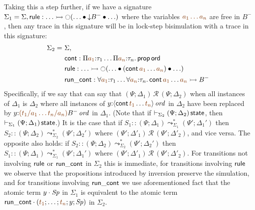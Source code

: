 Taking this a step further, if we have a signature
$\Sigma_1 = \Sigma, {\sf rule} : \ldots \rightarrowtail {\ocircle}(\ldots \mathbin{\bullet} {\downarrow}B^- \mathbin{\bullet} \ldots)
$
where the variables $\lf{a_1\ldots a_n}$ are free in $B^-$, 
then any trace in this signature will be in lock-step bisimulation
with a trace in this signature: 
\begin{align*}
\Sigma_2 = ~ & \Sigma,
\\    ~~ & {\sf cont} :  \Pi\lf{a_1}{:}\tau_1\ldots \Pi\lf{a_n}{:}\tau_n.\,{\sf prop}\,{\sf ord}
\\    ~~ & {\sf rule} : \ldots \lefti {\ocircle}(\ldots \fuse ({\sf cont}\,\lf{a_1}\ldots\lf{a_n}) \fuse \ldots)
\\    ~~ & {\sf run\_cont} : \forall\lf{a_1}{:}\tau_1\ldots \forall\lf{a_n}{:}\tau_n.\,{\sf cont}\,\lf{a_1}\ldots\lf{a_n} \lefti B^-
\end{align*}
Specifically, if we say that 
can say that $(\Psi; \Delta_1) \,\mathcal R\, (\Psi; \Delta_2)$ when 
all instances of $\Delta_1$ is $\Delta_2$ where all instances of 
$y{:}\istrue{\susp{{\sf cont}\,\lf{t_1}\ldots\lf{t_n}}}$ in $\Delta_2$ have been
replaced by $y{:}\istrue{\lf{(t_1/a_1\ldots t_n/a_n)}B^-}$ in $\Delta_1$. 
(Note that if $\vdash_{\Sigma_2} (\Psi; \Delta_2)\,{\sf state}$, then 
 $\vdash_{\Sigma_1} (\Psi; \Delta_1)\,{\sf state}$.)
It is the case that if
$S_1 :: (\Psi; \Delta_1) \leadsto^*_{\Sigma_1} (\Psi'; \Delta_1')$
then $S_2 :: (\Psi; \Delta_2) \leadsto^*_{\Sigma_2} (\Psi'; \Delta_2')$
where $(\Psi'; \Delta'_1) \,\mathcal R\, (\Psi'; \Delta'_2)$, and vice 
versa. The opposite also holds: if
$S_2 :: (\Psi; \Delta_2) \leadsto^*_{\Sigma_2} (\Psi'; \Delta_2')$
then $S_1 :: (\Psi; \Delta_1) \leadsto^*_{\Sigma_1} (\Psi'; \Delta_1')$
where $(\Psi'; \Delta'_1) \,\mathcal R\, (\Psi'; \Delta'_2)$. For transitions
not involving ${\sf rule}$ or ${\sf run\_cont}$ in $\Sigma_2$ this is immediate,
for transitions involving ${\sf rule}$ we observe that the propositions
introduced by inversion preserve the simulation, and for transitions 
involving ${\sf run\_cont}$ we use aforementioned fact that the atomic term
${y} \cdot {{\it Sp}}$ in $\Sigma_1$ is equivalent to the atomic term
$\tfocusl{\sf run\_cont}{(\lf{t_1}; \ldots; \lf{t_n}; y; \Sp)}$ in $\Sigma_2$. 

